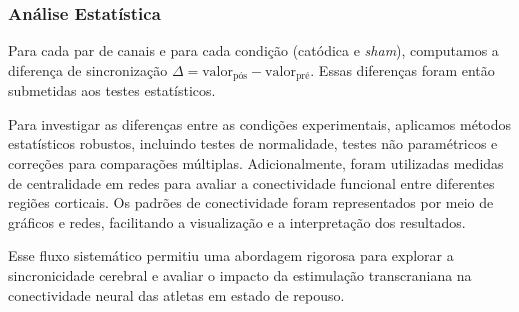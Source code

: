 \subsubsection{Análise Estatística} 
Para cada par de canais e para cada condição (catódica e \textit{sham}), computamos a diferença de sincronização \(\Delta = \text{valor}_{\text{pós}} - \text{valor}_{\text{pré}}\). Essas diferenças foram então submetidas aos testes estatísticos.

Para investigar as diferenças entre as condições experimentais, aplicamos métodos estatísticos robustos, incluindo testes de normalidade, testes não paramétricos e correções para comparações múltiplas. Adicionalmente, foram utilizadas medidas de centralidade em redes para avaliar a conectividade funcional entre diferentes regiões corticais. Os padrões de conectividade foram representados por meio de gráficos e redes, facilitando a visualização e a interpretação dos resultados.

Esse fluxo sistemático permitiu uma abordagem rigorosa para explorar a sincronicidade cerebral e avaliar o impacto da estimulação transcraniana na conectividade neural das atletas em estado de repouso.
